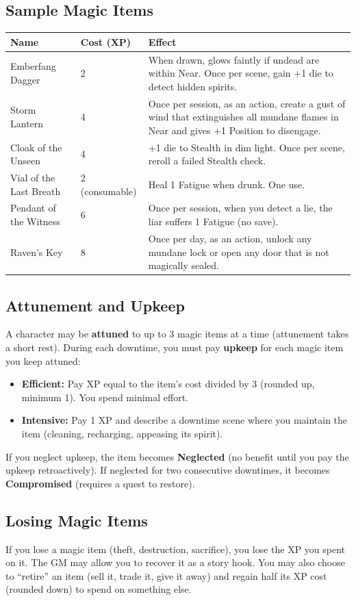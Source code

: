 \subsection{Sample Magic Items}

\begin{longtable}{p{3.5cm}p{3.5cm}p{7cm}}
\toprule
\textbf{Name} & \textbf{Cost (XP)} & \textbf{Effect} \\
\midrule
Emberfang Dagger & 2 & When drawn, glows faintly if undead are within Near. Once per scene, gain +1 die to detect hidden spirits. \\
Storm Lantern & 4 & Once per session, as an action, create a gust of wind that extinguishes all mundane flames in Near and gives +1 Position to disengage. \\
Cloak of the Unseen & 4 & +1 die to Stealth in dim light. Once per scene, reroll a failed Stealth check. \\
Vial of the Last Breath & 2 (consumable) & Heal 1 Fatigue when drunk. One use. \\
Pendant of the Witness & 6 & Once per session, when you detect a lie, the liar suffers 1 Fatigue (no save). \\
Raven's Key & 8 & Once per day, as an action, unlock any mundane lock or open any door that is not magically sealed. \\
\bottomrule
\end{longtable}

\subsection{Attunement and Upkeep}
A character may be \textbf{attuned} to up to 3 magic items at a time (attunement takes a short rest). During each downtime, you must pay \textbf{upkeep} for each magic item you keep attuned:
\begin{itemize}
  \item \textbf{Efficient:} Pay XP equal to the item's cost divided by 3 (rounded up, minimum 1). You spend minimal effort.
  \item \textbf{Intensive:} Pay 1 XP and describe a downtime scene where you maintain the item (cleaning, recharging, appeasing its spirit).
\end{itemize}
If you neglect upkeep, the item becomes \textbf{Neglected} (no benefit until you pay the upkeep retroactively). If neglected for two consecutive downtimes, it becomes \textbf{Compromised} (requires a quest to restore).

\subsection{Losing Magic Items}
If you lose a magic item (theft, destruction, sacrifice), you lose the XP you spent on it. The GM may allow you to recover it as a story hook. You may also choose to ``retire'' an item (sell it, trade it, give it away) and regain half its XP cost (rounded down) to spend on something else.


